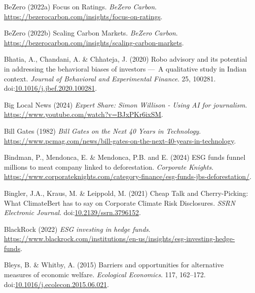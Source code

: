 \documentclass[
  letterpaper,
  DIV=11,
  numbers=noendperiod]{scrartcl}
\newlength{\cslhangindent}
\newenvironment{CSLReferences}[2] %
 {\begin{list}{}{%
  \setlength{\itemindent}{0pt}
  \setlength{\leftmargin}{0pt}
  \setlength{\parsep}{0pt}
  \ifodd #1
   \setlength{\leftmargin}{\cslhangindent}
   \setlength{\itemindent}{-1\cslhangindent}
  \fi
  \setlength{\itemsep}{#2\baselineskip}}}
 {\end{list}}
\begin{document}
\begin{CSLReferences}{0}{1}
BeZero (2022a) Focus on {Ratings}. \emph{BeZero Carbon}.
\url{https://bezerocarbon.com/insights/focus-on-ratings}.

BeZero (2022b) Scaling {Carbon Markets}. \emph{BeZero Carbon}.
\url{https://bezerocarbon.com/insights/scaling-carbon-markets}.

Bhatia, A., Chandani, A. \& Chhateja, J. (2020) Robo advisory and its
potential in addressing the behavioral biases of investors ---~{A}
qualitative study in {Indian} context. \emph{Journal of Behavioral and
Experimental Finance}. 25, 100281.
doi:\href{https://doi.org/10.1016/j.jbef.2020.100281}{10.1016/j.jbef.2020.100281}.

Big Local News (2024) \emph{Expert {Share}: {Simon Willison} - {Using
AI} for journalism}. \url{https://www.youtube.com/watch?v=BJxPKr6ixSM}.

Bill Gates (1982) \emph{Bill {Gates} on the {Next} 40 {Years} in
{Technology}}.
\url{https://www.pcmag.com/news/bill-gates-on-the-next-40-years-in-technology}.

Bindman, P., Mendonca, E. \& Mendonca, P.B. and E. (2024) {ESG} funds
funnel millions to meat company linked to deforestation. \emph{Corporate
Knights}.
\url{https://www.corporateknights.com/category-finance/esg-funds-jbs-deforestation/}.

Bingler, J.A., Kraus, M. \& Leippold, M. (2021) Cheap {Talk} and
{Cherry-Picking}: {What ClimateBert} has to say on {Corporate Climate
Risk Disclosures}. \emph{SSRN Electronic Journal}.
doi:\href{https://doi.org/10.2139/ssrn.3796152}{10.2139/ssrn.3796152}.

BlackRock (2022) \emph{{ESG} investing in hedge funds}.
\url{https://www.blackrock.com/institutions/en-us/insights/esg-investing-hedge-funds}.

Bleys, B. \& Whitby, A. (2015) Barriers and opportunities for
alternative measures of economic welfare. \emph{Ecological Economics}.
117, 162--172.
doi:\href{https://doi.org/10.1016/j.ecolecon.2015.06.021}{10.1016/j.ecolecon.2015.06.021}.


\end{CSLReferences}
\end{document}
